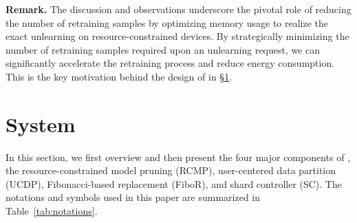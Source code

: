 \documentclass[conference,compsoc]{IEEEtran}
\begin{document}
\smallskip
\noindent\textbf{Remark.} The discussion and observations underscore the pivotal role of reducing the number of retraining samples by optimizing memory usage to realize the exact unlearning on resource-constrained devices. By strategically minimizing the number of retraining samples required upon an unlearning request, we can significantly accelerate the retraining process and reduce energy consumption. This is the key motivation behind the design of \tool in \S\ref{sec:cause}.


\section{\tool System}
\label{sec:cause}

In this section, we first overview \tool and then present the four major components of \tool, \ie the resource-constrained model pruning (RCMP), user-centered data partition (UCDP), Fibonacci-based replacement (FiboR), and shard controller (SC). The notations and symbols used in this paper are summarized in Table~\ref{tab:notations}.
\end{document}
